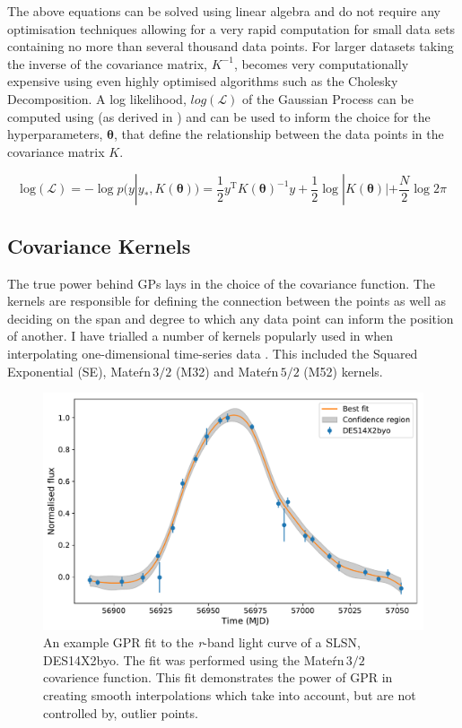 The above equations can be solved using linear algebra and do not require any optimisation techniques allowing for a very rapid computation for small data sets containing no more than several thousand data points. For larger datasets taking the inverse of the covariance matrix, $K^{-1}$, becomes very computationally expensive using even highly optimised algorithms such as the Cholesky Decomposition. A log likelihood, $log(\mathcal{L})$ of the Gaussian Process can be computed using  (as derived in \citet{Rasmussen2006}) and can be used to inform the choice for the hyperparameters, $\mathbf{\theta}$, that define the relationship between the data points in the covariance matrix $K$.

\begin{equation} \label{eg:logGP}
\mathrm{log(\mathcal{L})} = - \log p(y|y_*, K(\mathbf{\theta})) = \frac{1}{2} y^{\mathrm{T}} K(\mathbf{\theta})^{-1} y + \frac{1}{2} \log |K(\mathbf{\theta})| + \frac{N}{2} \log 2 \pi
\end{equation}

\subsection{Covariance Kernels} \label{sec:GPkernels}
The true power behind GPs lays in the choice of the covariance function. The kernels are responsible for defining the connection between the points as well as deciding on the span and degree to which any data point can inform the position of another. I have trialled a number of kernels popularly used in when interpolating one-dimensional time-series data \citep{Rasmussen2006}. This included the Squared Exponential (SE), Mate\'rn\,$3/2$ (M32) and Mate\'rn\,$5/2$ (M52) kernels.

\begin{figure}
  \centering
  \includegraphics[width=\textwidth]{Figures/Chapter3/GP_Example}
  \caption{An example GPR fit to the \textit{r}-band light curve of a SLSN, DES14X2byo. The fit was performed using the Mate\'rn\,$3/2$ covarience function. This fit demonstrates the power of GPR in creating smooth interpolations which take into account, but are not controlled by, outlier points.}
  \label{fig:GPKernels}
\end{figure}

